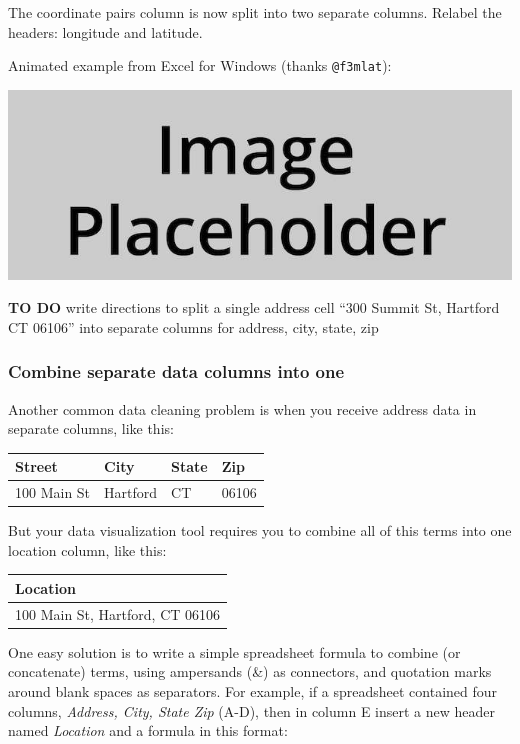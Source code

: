 \documentclass[
  english,
]{book}
\begin{document}
The coordinate pairs column is now split into two separate columns. Relabel the headers: longitude and latitude.

Animated example from Excel for Windows (thanks \texttt{@f3mlat}):

\includegraphics{images/placeholder.jpg}

\textbf{TO DO} write directions to split a single address cell ``300 Summit St, Hartford CT 06106'' into separate columns for address, city, state, zip

\hypertarget{combine-separate-data-columns-into-one}{%
\subsubsection*{Combine separate data columns into one}\label{combine-separate-data-columns-into-one}}

Another common data cleaning problem is when you receive address data in separate columns, like this:

\begin{longtable}[]{@{}llll@{}}
\toprule
Street & City & State & Zip\tabularnewline
\midrule
\endhead
100 Main St & Hartford & CT & 06106\tabularnewline
\bottomrule
\end{longtable}

But your data visualization tool requires you to combine all of this terms into one location column, like this:

\begin{longtable}[]{@{}l@{}}
\toprule
Location\tabularnewline
\midrule
\endhead
100 Main St, Hartford, CT 06106\tabularnewline
\bottomrule
\end{longtable}

One easy solution is to write a simple spreadsheet formula to combine (or concatenate) terms, using ampersands (\&) as connectors, and quotation marks around blank spaces as separators. For example, if a spreadsheet contained four columns, \emph{Address, City, State Zip} (A-D), then in column E insert a new header named \emph{Location} and a formula in this format:
\end{document}
